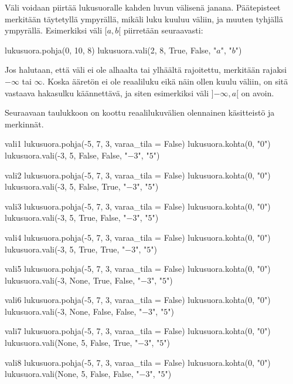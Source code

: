 Väli voidaan piirtää lukusuoralle kahden luvun välisenä janana. Päätepisteet merkitään täytetyllä ympyrällä, mikäli luku kuuluu väliin, ja muuten tyhjällä ympyrällä. Esimerkiksi väli $[a, b[$ piirretään seuraavasti:

\begin{kuva}
lukusuora.pohja(0, 10, 8)
lukusuora.vali(2, 8, True, False, "$a$", "$b$")
\end{kuva}

Jos halutaan, että väli ei ole alhaalta tai ylhäältä rajoitettu, merkitään rajaksi $-\infty$ tai $\infty$. Koska ääretön ei ole reaaliluku eikä näin ollen kuulu väliin, on sitä vastaava hakasulku käännettävä, ja siten esimerkiksi väli $]{-\infty}, a[$ on avoin. 

Seuraavaan taulukkoon on koottu reaalilukuvälien olennainen käsitteistö ja merkinnät.

\begin{luoKuva}{vali1}
lukusuora.pohja(-5, 7, 3, varaa_tila = False)
lukusuora.kohta(0, "$0$")
lukusuora.vali(-3, 5, False, False, "$-3$", "$5$")
\end{luoKuva}
\begin{luoKuva}{vali2}
lukusuora.pohja(-5, 7, 3, varaa_tila = False)
lukusuora.kohta(0, "$0$")
lukusuora.vali(-3, 5, False, True, "$-3$", "$5$")
\end{luoKuva}
\begin{luoKuva}{vali3}
lukusuora.pohja(-5, 7, 3, varaa_tila = False)
lukusuora.kohta(0, "$0$")
lukusuora.vali(-3, 5, True, False, "$-3$", "$5$")
\end{luoKuva}
\begin{luoKuva}{vali4}
lukusuora.pohja(-5, 7, 3, varaa_tila = False)
lukusuora.kohta(0, "$0$")
lukusuora.vali(-3, 5, True, True, "$-3$", "$5$")
\end{luoKuva}
\begin{luoKuva}{vali5}
lukusuora.pohja(-5, 7, 3, varaa_tila = False)
lukusuora.kohta(0, "$0$")
lukusuora.vali(-3, None, True, False, "$-3$", "$5$")
\end{luoKuva}
\begin{luoKuva}{vali6}
lukusuora.pohja(-5, 7, 3, varaa_tila = False)
lukusuora.kohta(0, "$0$")
lukusuora.vali(-3, None, False, False, "$-3$", "$5$")
\end{luoKuva}
\begin{luoKuva}{vali7}
lukusuora.pohja(-5, 7, 3, varaa_tila = False)
lukusuora.kohta(0, "$0$")
lukusuora.vali(None, 5, False, True, "$-3$", "$5$")
\end{luoKuva}
\begin{luoKuva}{vali8}
lukusuora.pohja(-5, 7, 3, varaa_tila = False)
lukusuora.kohta(0, "$0$")
lukusuora.vali(None, 5, False, False, "$-3$", "$5$")
\end{luoKuva}

